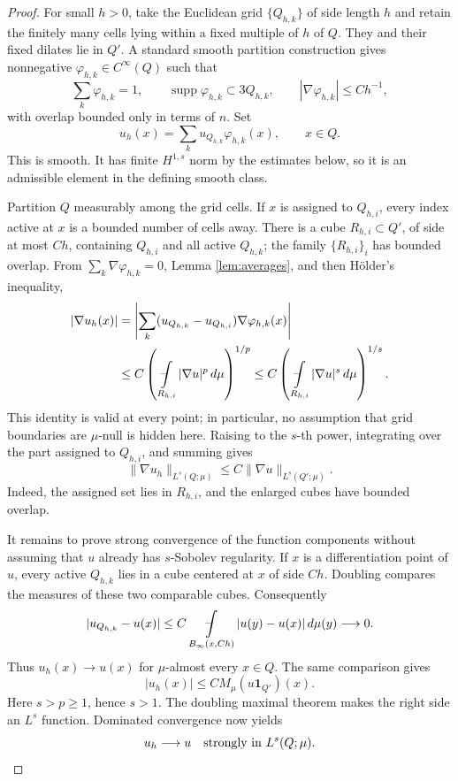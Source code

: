 \documentclass[11pt]{article}
\newcommand{\avgint}{\mathop{\rlap{\raisebox{.12ex}{--}}\!\int}}
\begin{document}
\begin{proof}
For small \(h>0\), take the Euclidean grid \(\{Q_{h,k}\}\) of side length
\(h\) and retain the finitely many cells lying within a fixed multiple of
\(h\) of \(Q\).  They and their fixed dilates lie in \(Q'\).  A standard
smooth partition construction gives nonnegative
\(\varphi_{h,k}\in C^\infty(Q)\) such that
\begin{equation}\label{eq:partition}
 \sum_k\varphi_{h,k}=1,\qquad
 \operatorname{supp}\varphi_{h,k}\subset 3Q_{h,k},\qquad
 |\nabla\varphi_{h,k}|\le C h^{-1},
\end{equation}
with overlap bounded only in terms of \(n\).  Set
\[
       u_h(x)=\sum_k u_{Q_{h,k}}\varphi_{h,k}(x),\qquad x\in Q.
\]
This is smooth.  It has finite \(H^{1,s}\) norm by the estimates below, so it
is an admissible element in the defining smooth class.

Partition \(Q\) measurably among the grid cells.  If \(x\) is assigned to
\(Q_{h,i}\), every index active at \(x\) is a bounded number of cells away.
There is a cube \(R_{h,i}\subset Q'\), of side at most \(C h\), containing
\(Q_{h,i}\) and all active \(Q_{h,k}\); the family
\(\{R_{h,i}\}_i\) has bounded overlap.  From
\(\sum_k\nabla\varphi_{h,k}=0\), Lemma \ref{lem:averages}, and then
H\"older's inequality,
\begin{align}
 |\nabla u_h(x)|
 &=\left|\sum_k(u_{Q_{h,k}}-u_{Q_{h,i}})
                     \nabla\varphi_{h,k}(x)\right| \notag\\
 &\le C\left(\avgint_{R_{h,i}}|\nabla u|^p\,d\mu\right)^{1/p}
 \le C\left(\avgint_{R_{h,i}}|\nabla u|^s\,d\mu\right)^{1/s}.
 \label{eq:pointgrad}
\end{align}
This identity is valid at every point; in particular, no assumption that
grid boundaries are \(\mu\)-null is hidden here.  Raising to the \(s\)-th
power, integrating over the part assigned to \(Q_{h,i}\), and summing gives
\begin{equation}\label{eq:gradbound}
       \|\nabla u_h\|_{L^s(Q;\mu)}
       \le C\|\nabla u\|_{L^s(Q';\mu)}.
\end{equation}
Indeed, the assigned set lies in \(R_{h,i}\), and the enlarged cubes have
bounded overlap.

It remains to prove strong convergence of the function components without
assuming that \(u\) already has \(s\)-Sobolev regularity.  If \(x\) is a
differentiation point of \(u\), every active \(Q_{h,k}\) lies in a cube
centered at \(x\) of side \(C h\).  Doubling compares the measures of these
two comparable cubes.  Consequently
\[
 |u_{Q_{h,k}}-u(x)|
 \le C\avgint_{B_\infty(x,Ch)}|u(y)-u(x)|\,d\mu(y)\longrightarrow0.
\]
Thus \(u_h(x)\to u(x)\) for \(\mu\)-almost every \(x\in Q\).  The same
comparison gives
\begin{equation}\label{eq:maxdom}
       |u_h(x)|\le C M_\mu(u\mathbf1_{Q'})(x).
\end{equation}
Here \(s>p\ge1\), hence \(s>1\).  The doubling maximal theorem makes the
right side an \(L^s\) function.  Dominated convergence now yields
\begin{equation}\label{eq:functionconv}
             u_h\longrightarrow u\quad\hbox{strongly in }L^s(Q;\mu).
\end{equation}


\end{proof}
\end{document}
